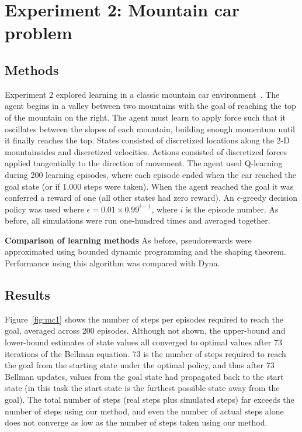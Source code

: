 \documentclass[letterpaper]{article}
\begin{document}
\section{Experiment 2: Mountain car problem}

\subsection{Methods}

Experiment 2 explored learning in a classic mountain car environment~\cite{moore1990efficient, sutton1996generalization, sutton1998reinforcement, smart2000practical, rasmussen2003gaussian, whiteson2006evolutionary, heidrich2008variable, sutton2012dyna}. The agent begins in a valley between two mountains with the goal of reaching the top of the mountain on the right. The agent must learn to apply force such that it oscillates between the slopes of each mountain, building enough momentum until it finally reaches the top. States consisted of discretized locations along the 2-D mountainsides and discretized velocities. Actions consisted of discretized forces applied tangentially to the direction of movement. The agent used Q-learning during 200 learning episodes, where each episode ended when the car reached the goal state (or if 1,000 steps were taken). When the agent reached the goal it was conferred a reward of one (all other states had zero reward). An $\epsilon$-greedy decision policy was used where $\epsilon=0.01\times0.99^{i-1}$, where $i$ is the episode number. As before, all simulations were run one-hundred times and averaged together.

\noindent
\textbf{Comparison of learning methods} As before, pseudorewards were approximated using bounded dynamic programming and the shaping theorem. Performance using this algorithm was compared with Dyna.

\subsection{Results}

Figure~\ref{fig:mc1} shows the number of steps per episodes required to reach the goal, averaged across 200 episodes. Although not shown, the upper-bound and lower-bound estimates of state values all converged to optimal values after 73 iterations of the Bellman equation. 73 is the number of steps required to reach the goal from the starting state under the optimal policy, and thus after 73 Bellman updates, values from the goal state had propagated back to the start state (in this task the start state is the furthest possible state away from the goal).
The total number of steps (real steps plus simulated steps) far exceeds the number of steps using our method, and even the number of actual steps alone does not converge as low as the number of steps taken using our method.
\end{document}

